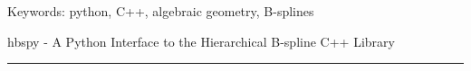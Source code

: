 \documentclass[12pt, twoside]{article}
\theoremstyle{definition} %
\numberwithin{equation}{section}
\newcommand \thetitle{hbspy -  A Python Interface to the Hierarchical B-spline C++ Library}
\begin{document}
  

  \vfill
  \noindent Keywords: python, C++, algebraic geometry, B-splines

  \newpage
  \tableofcontents

\newpage
{}  %
\setcounter{page}{1}  %
\thispagestyle{empty}
\pagestyle{mainDoc}

\begin{center}
\huge{\thetitle}  %
\rule{\linewidth}{.1pt}
\end{center}







\newpage

\end{document}
